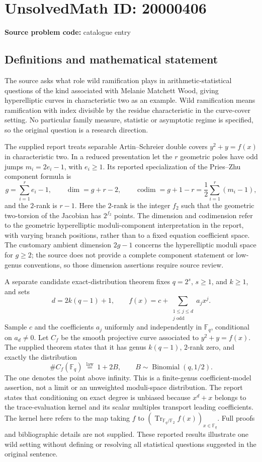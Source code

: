 \documentclass[11pt]{article}
\newcommand{\F}{\mathbb{F}}
\begin{document}
\section*{UnsolvedMath ID: 20000406}
\textbf{Source problem code:} catalogue entry
\subsection{Definitions and mathematical statement}
The source asks what role wild ramification plays in arithmetic-statistical questions of the kind associated with Melanie Matchett Wood, giving hyperelliptic curves in characteristic two as an example. Wild ramification means ramification with index divisible by the residue characteristic in the curve-cover setting. No particular family measure, statistic or asymptotic regime is specified, so the original question is a research direction.

The supplied report treats separable Artin--Schreier double covers \(y^2+y=f(x)\) in characteristic two. In a reduced presentation let the \(r\) geometric poles have odd jumps \(m_i=2e_i-1\), with \(e_i\ge1\). Its reported specialization of the Pries--Zhu component formula is
\[
 g=\sum_{i=1}^r e_i-1,\qquad
 \dim=g+r-2,\qquad
 \operatorname{codim}=g+1-r=\frac12\sum_{i=1}^r(m_i-1),
\]
and the \(2\)-rank is \(r-1\). Here the \(2\)-rank is the integer \(f_2\) such that the geometric two-torsion of the Jacobian has \(2^{f_2}\) points. The dimension and codimension refer to the geometric hyperelliptic moduli-component interpretation in the report, with varying branch positions, rather than to a fixed equation coefficient space. The customary ambient dimension \(2g-1\) concerns the hyperelliptic moduli space for \(g\ge2\); the source does not provide a complete component statement or low-genus conventions, so those dimension assertions require source review.

A separate candidate exact-distribution theorem fixes \(q=2^s\), \(s\ge1\), and \(k\ge1\), and sets
\[
 d=2k(q-1)+1,\qquad
 f(x)=c+\sum_{\substack{1\le j\le d\\j\text{ odd}}}a_jx^j.
\]
Sample \(c\) and the coefficients \(a_j\) uniformly and independently in \(\F_q\), conditional on \(a_d\ne0\). Let \(C_f\) be the smooth projective curve associated to \(y^2+y=f(x)\). The supplied theorem states that it has genus \(k(q-1)\), \(2\)-rank zero, and exactly the distribution
\[
 \#C_f(\F_q)\ \overset{\mathrm{law}}=\ 1+2B,
 \qquad B\sim\operatorname{Binomial}(q,1/2).
\]
The one denotes the point above infinity. This is a finite-genus coefficient-model assertion, not a limit or an unweighted moduli-space distribution. The report states that conditioning on exact degree is unbiased because \(x^d+x\) belongs to the trace-evaluation kernel and its scalar multiples transport leading coefficients. The kernel here refers to the map taking \(f\) to \((\operatorname{Tr}_{\F_q/\F_2}f(x))_{x\in\F_q}\). Full proofs and bibliographic details are not supplied. These reported results illustrate one wild setting without defining or resolving all statistical questions suggested in the original sentence.
\end{document}

